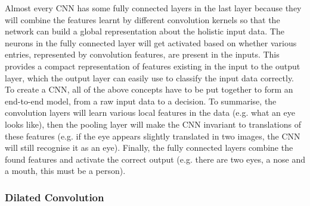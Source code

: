 \noindent
Almost every \gls{CNN} has some fully connected layers in the last layer because they will combine the features learnt by different convolution kernels so that the network can build a global representation about the holistic input data. The neurons in the fully connected layer will get activated based on whether various entries, represented by convolution features, are present in the inputs. This provides a compact representation of features existing in the input to the output layer, which the output layer can easily use to classify the input data correctly.
\newline
\newline
To create a \gls{CNN}, all of the above concepts have to be put together to form an end-to-end model, from a raw input data to a decision. To summarise, the convolution layers will learn various local features in the data (e.g. what an eye looks like), then the pooling layer will make the \gls{CNN} invariant to translations of these features (e.g. if the eye appears slightly translated in two images, the \gls{CNN} will still recognise it as an eye). Finally, the fully connected layers combine the found features and activate the correct output (e.g. there are two eyes, a nose and a mouth, this must be a person).

\subsubsection{Dilated Convolution}
\label{subsub:Dilated-Convolution}

